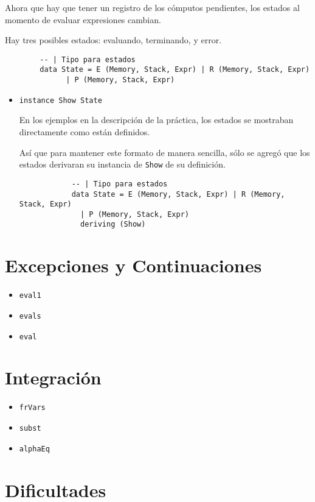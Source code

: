 \documentclass{article}
\newcommand{\tx}[1]{\texttt{#1}}
\begin{document}
    Ahora que hay que tener un registro de los cómputos pendientes, los estados
    al momento de evaluar expresiones cambian.

    Hay tres posibles estados: evaluando, terminando, y error.

    \begin{verbatim}
        -- | Tipo para estados
        data State = E (Memory, Stack, Expr) | R (Memory, Stack, Expr) 
              | P (Memory, Stack, Expr)
    \end{verbatim}

    \begin{itemize}
        \item \tx{instance Show State}

        En los ejemplos en la descripción de la práctica, los estados se
        mostraban directamente como están definidos.

        Así que para mantener este formato de manera sencilla, sólo se agregó 
        que los estados derivaran su instancia de \tx{Show} de su definición.

        \begin{verbatim}
            -- | Tipo para estados
            data State = E (Memory, Stack, Expr) | R (Memory, Stack, Expr) 
              | P (Memory, Stack, Expr)
              deriving (Show)
        \end{verbatim}



    \end{itemize}

    \section{Excepciones y Continuaciones}

    \begin{itemize}
        \item \tx{eval1}
        \item\tx{evals}
        \item \tx{eval}
    \end{itemize}

    \section{Integración}

    \begin{itemize}
        \item \tx{frVars}
        \item \tx{subst}
        \item \tx{alphaEq}
    \end{itemize}

    \section*{Dificultades}
\end{document}
